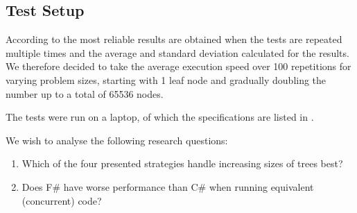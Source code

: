 \subsection{Test Setup}
According to \cite{sestoft2013microbenchmarks} the most reliable results are obtained when the tests are repeated multiple times and the average and standard deviation calculated for the results. We therefore decided to take the average execution speed over 100 repetitions for varying problem sizes, starting with 1 leaf node and gradually doubling the number up to a total of 65536 nodes.

The tests were run on a laptop, of which the specifications are listed in .


We wish to analyse the following research questions:
\begin{enumerate}
    \item Which of the four presented strategies handle increasing sizes of trees best?
    \item Does F\# have worse performance than C\# when running equivalent (concurrent) code?
\end{enumerate}

